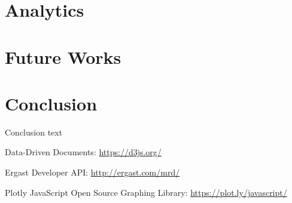 \documentclass[10pt,twocolumn,letterpaper]{article}
\begin{document}
\section{Analytics}


\section{Future Works}

\section{Conclusion}
Conclusion text

\begin{thebibliography}{100} 
	 Data-Driven Documents: \href{https://d3js.org/}{https://d3js.org/}
	
	 Ergast Developer API: \href{http://ergast.com/mrd/}{http://ergast.com/mrd/}
	
	 Plotly JavaScript Open Source Graphing Library: \href{https://plot.ly/javascript/}{https://plot.ly/javascript/}
\end{thebibliography}
\end{document}
